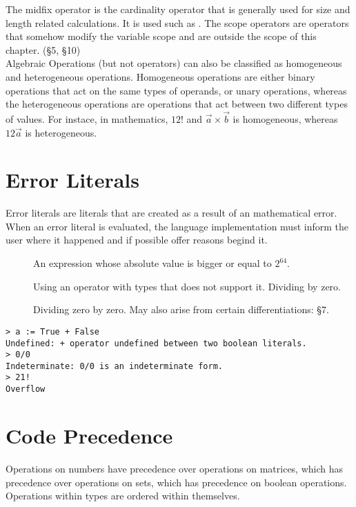 \documentclass[11pt,a4paper]{book}
\begin{document}
The midfix operator is the cardinality operator that is generally used for size and length related calculations. It is used such as . The scope operators are operators that somehow modify the variable scope and are outside the scope of this chapter. (\S 5, \S 10) \\

Algebraic Operations (but not operators) can also be classified as homogeneous and heterogeneous operations. Homogeneous operations are either binary operations that act on the same types of operands, or unary operations, whereas the heterogeneous operations are operations that act between two different types of values. For instace, in mathematics, $12!$ and $\vec{a} \times \vec{b}$ is homogeneous, whereas $12\vec{a}$ is heterogeneous. \\

\section{Error Literals}

Error literals are literals that are created as a result of an mathematical error. When an error literal is evaluated, the language implementation must inform the user where it happened and if possible offer reasons begind it.

\begin{description}
\item[] An expression whose absolute value is bigger or equal to $2^{64}$.
\item[] Using an operator with types that does not support it. Dividing by zero.
\item[] Dividing zero by zero. May also arise from certain differentiations: \S 7.
\end{description}

\begin{lstlisting}[caption={Error Literal Examples}, captionpos=b]
> a := True + False
Undefined: + operator undefined between two boolean literals.
> 0/0
Indeterminate: 0/0 is an indeterminate form.
> 21!
Overflow
\end{lstlisting}

\section{Code Precedence}

Operations on numbers have precedence over operations on matrices, which has precedence over operations on sets, which has precedence on boolean operations. Operations within types are ordered within themselves.
\end{document}
